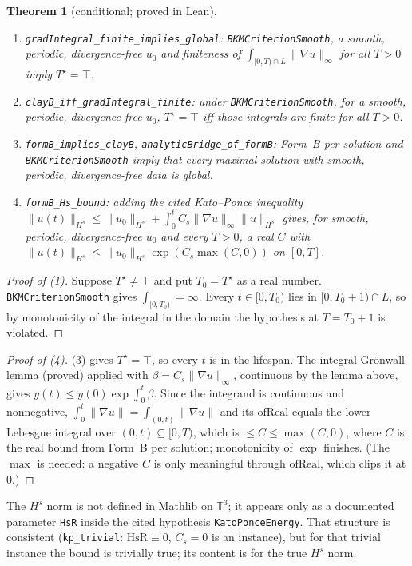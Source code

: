 \documentclass[11pt]{article}
\newtheorem{theorem}{Theorem}
\theoremstyle{definition}
\newcommand{\T}{\mathbb{T}^3}
\newcommand{\Tstar}{T^\star}
\newcommand{\lean}[1]{\texttt{#1}}
\begin{document}
\begin{theorem}[conditional; proved in Lean]\leavevmode
\begin{enumerate}
\item \lean{gradIntegral\_finite\_implies\_global}: \lean{BKMCriterionSmooth}, a smooth,
periodic, divergence-free $u_0$ and finiteness of
$\int_{[0,T)\cap L}\|\nabla u\|_\infty$ for all $T>0$ imply $\Tstar=\top$.
\item \lean{clayB\_iff\_gradIntegral\_finite}: under \lean{BKMCriterionSmooth}, for a
smooth, periodic, divergence-free $u_0$, $\Tstar=\top$ iff those integrals are finite
for all $T>0$.
\item \lean{formB\_implies\_clayB}, \lean{analyticBridge\_of\_formB}: Form~B per solution
and \lean{BKMCriterionSmooth} imply that every maximal solution with smooth, periodic,
divergence-free data is global.
\item \lean{formB\_Hs\_bound}: adding the cited Kato--Ponce inequality
$\|u(t)\|_{H^s}\le\|u_0\|_{H^s}+\int_0^t C_s\|\nabla u\|_\infty\|u\|_{H^s}$
gives, for smooth, periodic, divergence-free $u_0$ and every $T>0$, a real $C$ with
$\|u(t)\|_{H^s}\le\|u_0\|_{H^s}\exp(C_s\max(C,0))$ on $[0,T]$.
\end{enumerate}
\end{theorem}
\begin{proof}[Proof of (1)]
Suppose $\Tstar\ne\top$ and put $T_0=\Tstar$ as a real number. \lean{BKMCriterionSmooth} gives
$\int_{[0,T_0)}=\infty$. Every $t\in[0,T_0)$ lies in $[0,T_0+1)\cap L$, so by
monotonicity of the integral in the domain the hypothesis at $T=T_0+1$ is violated.
\end{proof}
\begin{proof}[Proof of (4)]
(3) gives $\Tstar=\top$, so every $t$ is in the lifespan. The integral Grönwall lemma
(proved) applied with $\beta=C_s\|\nabla u\|_\infty$, continuous by the lemma above,
gives $y(t)\le y(0)\exp\int_0^t\beta$. Since the integrand is continuous and
nonnegative, $\int_0^t\|\nabla u\| = \int_{(0,t)}\|\nabla u\|$ and its
$\mathrm{ofReal}$ equals the lower Lebesgue integral over $(0,t)\subseteq[0,T)$, which is
$\le C\le\max(C,0)$, where $C$ is the real bound from Form~B per solution;
monotonicity of $\exp$ finishes. (The $\max$ is needed: a negative $C$ is only
meaningful through $\mathrm{ofReal}$, which clips it at $0$.)
\end{proof}
The $H^s$ norm is not defined in Mathlib on $\T$; it appears only as a documented
parameter \lean{HsR} inside the cited hypothesis \lean{KatoPonceEnergy}. That structure
is consistent (\lean{kp\_trivial}: $\mathrm{HsR}\equiv 0$, $C_s=0$ is an instance), but
for that trivial instance the bound is trivially true; its content is for the true
$H^s$ norm.
\end{document}
